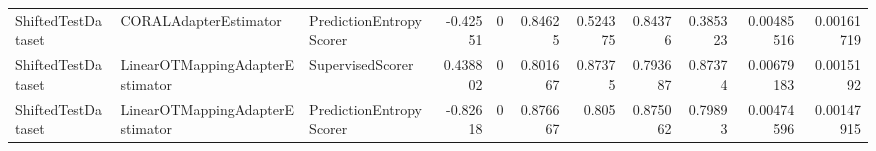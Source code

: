 \begin{tabular}{lllrrrrrrrr}
 ShiftedTestDataset      & CORALAdapterEstimator           & PredictionEntropyScorer &        -0.42551   &      0           &         0.84625   &         0.524375  &  0.84376    &  0.385323   &      0.00485516 &        0.00161719 \\
 ShiftedTestDataset      & LinearOTMappingAdapterEstimator & SupervisedScorer        &         0.438802  &      0           &         0.801667  &         0.87375   &  0.793687   &  0.87374    &      0.00679183 &        0.0015192  \\
 ShiftedTestDataset      & LinearOTMappingAdapterEstimator & PredictionEntropyScorer &        -0.82618   &      0           &         0.876667  &         0.805     &  0.875062   &  0.79893    &      0.00474596 &        0.00147915 \\
\hline
\end{tabular}